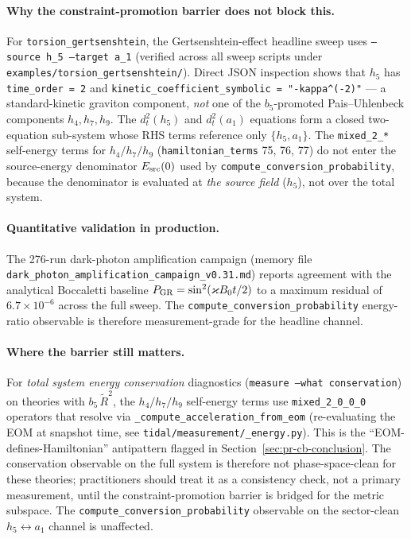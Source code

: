 \paragraph{Why the constraint-promotion barrier does not block this.}
For \texttt{torsion\_gertsenshtein}, the Gertsenshtein-effect headline
sweep uses \texttt{--source h\_5 --target a\_1} (verified across all
sweep scripts under \texttt{examples/torsion\_gertsenshtein/}).  Direct
JSON inspection shows that $h_5$ has
\texttt{time\_order = 2} and
\texttt{kinetic\_coefficient\_symbolic = "-kappa\^{}(-2)"} --- a
standard-kinetic graviton component, \emph{not} one of the
$b_5$-promoted Pais--Uhlenbeck components $h_4, h_7, h_9$.  The
$d_t^2(h_5)$ and $d_t^2(a_1)$ equations form a closed two-equation
sub-system whose RHS terms reference only $\{h_5, a_1\}$.  The
\texttt{mixed\_2\_*} self-energy terms for $h_4/h_7/h_9$
(\texttt{hamiltonian\_terms} 75, 76, 77) do not enter the source-energy
denominator $E_{\rm src}(0)$ used by
\texttt{compute\_conversion\_probability}, because the denominator is
evaluated at \emph{the source field} ($h_5$), not over the total system.

\paragraph{Quantitative validation in production.}
The 276-run dark-photon amplification campaign (memory file
\texttt{dark\_photon\_amplification\_campaign\_v0.31.md}) reports
agreement with the analytical Boccaletti baseline
$P_{\rm GR} = \sin^2(\kappa B_0 t / 2)$ to a maximum residual of
$6.7 \times 10^{-6}$ across the full sweep.  The
\texttt{compute\_conversion\_probability} energy-ratio observable is
therefore measurement-grade for the headline channel.

\paragraph{Where the barrier still matters.}
For \emph{total system energy conservation} diagnostics (\texttt{measure
--what conservation}) on theories with $b_5\,\tilde{R}^2$, the
$h_4/h_7/h_9$ self-energy terms use \texttt{mixed\_2\_0\_0\_0}
operators that resolve via \texttt{\_compute\_acceleration\_from\_eom}
(re-evaluating the EOM at snapshot time, see
\texttt{tidal/measurement/\_energy.py}).  This is the
``EOM-defines-Hamiltonian'' antipattern flagged in
Section~\ref{sec:pr-cb-conclusion}.  The conservation observable on the
full system is therefore not phase-space-clean for these theories;
practitioners should treat it as a consistency check, not a primary
measurement, until the constraint-promotion barrier is bridged for
the metric subspace.  The
\texttt{compute\_conversion\_probability} observable on the
sector-clean $h_5 \leftrightarrow a_1$ channel is unaffected.

